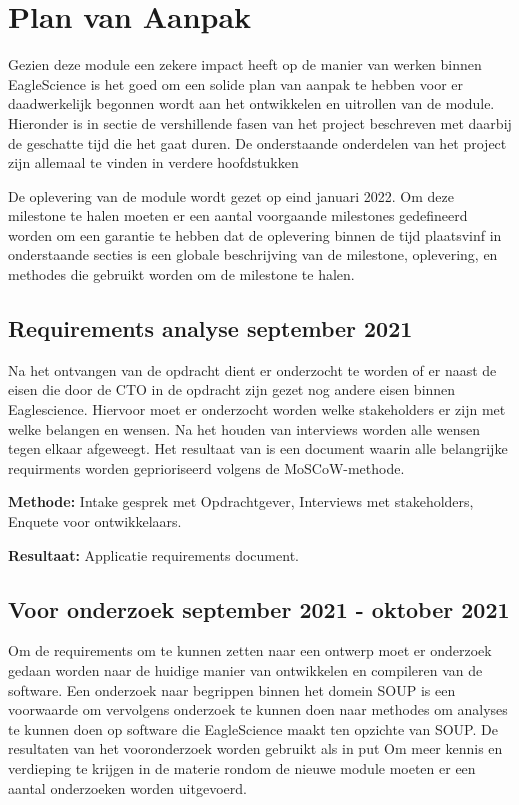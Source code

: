 
\chapter{Plan van Aanpak}\label{ch:planvanaanpak} %

Gezien deze module een zekere impact heeft op de manier van werken binnen EagleScience is het goed om een solide plan van aanpak te hebben voor er daadwerkelijk begonnen wordt aan het ontwikkelen en uitrollen van de module. Hieronder is in sectie de vershillende fasen van het project beschreven met daarbij de geschatte tijd die het gaat duren. De onderstaande onderdelen van het project zijn allemaal te vinden in verdere hoofdstukken

De oplevering van de module wordt gezet op eind januari 2022. Om deze milestone te halen moeten er een aantal voorgaande milestones gedefineerd worden om een garantie te hebben dat de oplevering binnen de tijd plaatsvinf in onderstaande secties is een globale beschrijving van de milestone, oplevering, en methodes die gebruikt worden om de milestone te halen.

\section{Requirements analyse \textbf{september 2021}}\label{sec:requirements-analyse}
Na het ontvangen van de opdracht dient er onderzocht te worden of er naast de eisen die door de CTO in de opdracht zijn gezet nog andere eisen binnen Eaglescience. Hiervoor moet er onderzocht worden welke stakeholders er zijn met welke belangen en wensen. Na het houden van interviews worden alle wensen tegen elkaar afgeweegt. Het resultaat van is een document waarin alle belangrijke requirments worden geprioriseerd volgens de MoSCoW-methode.

\textbf{Methode:} Intake gesprek met Opdrachtgever, Interviews met stakeholders, Enquete voor ontwikkelaars.

\textbf{Resultaat:} Applicatie requirements document. %

\section{Voor onderzoek \textbf{september 2021 - oktober 2021 }}\label{sec:onderzoek}
Om de requirements om te kunnen zetten naar een ontwerp moet er onderzoek gedaan worden naar de huidige manier van ontwikkelen en compileren van de software. Een onderzoek naar begrippen binnen het domein SOUP is een voorwaarde om vervolgens onderzoek te kunnen doen naar methodes om analyses te kunnen doen op software die EagleScience maakt ten opzichte van SOUP. De resultaten van het vooronderzoek worden gebruikt als in put
Om meer kennis en verdieping te krijgen in de materie rondom de nieuwe module moeten er een aantal onderzoeken worden uitgevoerd.


